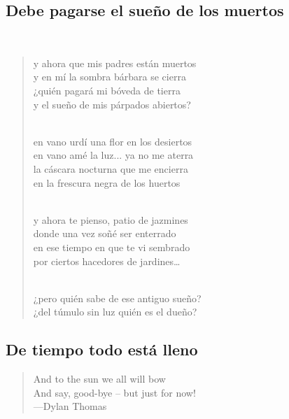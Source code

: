 \documentclass[a4paper, 12pt]{article}
\begin{document}
\pagebreak 

\subsection{Debe pagarse el sueño de los muertos}
~ 

\begin{verse}
y ahora que mis padres están muertos\\
y en mí la sombra bárbara se cierra\\
¿quién pagará mi bóveda de tierra\\
y el sueño de mis párpados abiertos?\\
~ 

en vano urdí una flor en los desiertos\\
en vano amé la luz... ya no me aterra\\
la cáscara nocturna que me encierra\\
en la frescura negra de los huertos\\
~ 

y ahora te pienso, patio de jazmines\\
donde una vez soñé ser enterrado\\
en ese tiempo en que te vi sembrado\\
por ciertos hacedores de jardines…\\
~ 

¿pero quién sabe de ese antiguo sueño?\\
¿del túmulo sin luz quién es el dueño?\\
\end{verse}

\pagebreak
\subsection{De tiempo todo está lleno}

\scriptsize
\begin{quote}
    \hspace*{\fill}And to the sun we all will bow\\
\hspace*{\fill}And say, good-bye – but just for now!\\
\hspace*{\fill}—Dylan Thomas
\end{quote}
\normalsize
\end{document}
